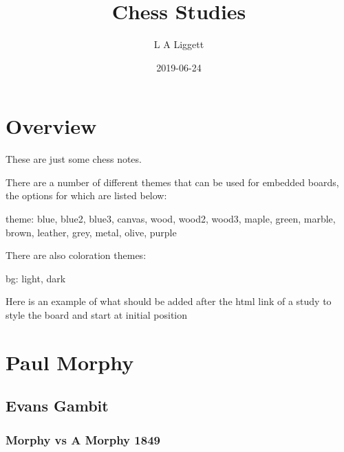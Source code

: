 \documentclass[]{book}
\title{Chess Studies}
\author{L A Liggett}
\date{2019-06-24}
\newenvironment{Shaded}{\begin{snugshade}}{\end{snugshade}}
\newcommand{\CommentTok}[1]{\textcolor[rgb]{0.56,0.35,0.01}{\textit{#1}}}
\newcommand{\OperatorTok}[1]{\textcolor[rgb]{0.81,0.36,0.00}{\textbf{#1}}}
\newcommand{\NormalTok}[1]{#1}
\begin{document}
\maketitle

{
\setcounter{tocdepth}{1}
\tableofcontents
}
\chapter{Overview}\label{overview}

These are just some chess notes.

There are a number of different themes that can be used for embedded
boards, the options for which are listed below:

\begin{Shaded}
\begin{Highlighting}[]
\NormalTok{theme: blue, blue2, blue3, canvas, wood, wood2, wood3, maple, green, marble, brown, leather, grey, metal, olive, purple}
\end{Highlighting}
\end{Shaded}

There are also coloration themes:

\begin{Shaded}
\begin{Highlighting}[]
\NormalTok{bg: light, dark}
\end{Highlighting}
\end{Shaded}

Here is an example of what should be added after the html link of a
study to style the board and start at initial position

\begin{Shaded}
\end{Shaded}

\chapter{Paul Morphy}\label{morphy}

\section{Evans Gambit}\label{evans-gambit}

\subsection{Morphy vs A Morphy 1849}\label{morphy-vs-a-morphy-1849}
\end{document}
